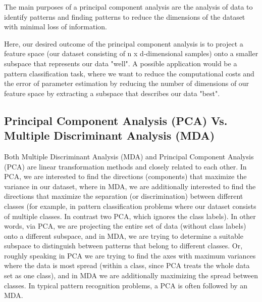 The main purposes of a principal component analysis are the analysis of data to identify patterns and finding patterns to 
reduce the dimensions of the dataset with minimal loss of information.

Here, our desired outcome of the principal component analysis is to project a feature space (our dataset consisting of 
n x d-dimensional samples) onto a smaller subspace that represents our data "well". A possible application would be a pattern 
classification task, where we want to reduce the computational costs and the error of parameter estimation by reducing the 
number of dimensions of our feature space by extracting a subspace that describes our data "best".


\subsection*{Principal Component Analysis (PCA) Vs. Multiple Discriminant Analysis (MDA)}

Both Multiple Discriminant Analysis (MDA) and Principal Component Analysis (PCA) are linear transformation methods and closely related to each other. In PCA, we are interested to find the directions (components) that maximize the variance in our dataset, where in MDA, we are additionally interested to find the directions that maximize the separation (or discrimination) between different classes (for example, in pattern classification problems where our dataset consists of multiple classes. In contrast two PCA, which ignores the class labels).
In other words, via PCA, we are projecting the entire set of data (without class labels) onto a different subspace, and in MDA, we are trying to determine a suitable subspace to distinguish between patterns that belong to different classes. Or, roughly speaking in PCA we are trying to find the axes with maximum variances where the data is most spread (within a class, since PCA treats the whole data set as one class), and in MDA we are additionally maximizing the spread between classes. 
In typical pattern recognition problems, a PCA is often followed by an MDA.

